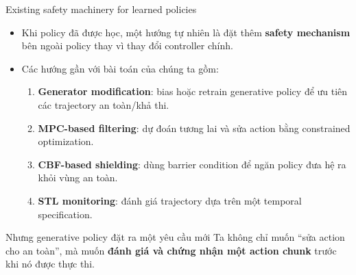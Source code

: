 \documentclass[aspectratio=169]{beamer}
\begin{document}
\begin{frame}[t,shrink=8]{Existing safety machinery for learned policies}

\begin{itemize}
    \item Khi policy đã được học, một hướng tự nhiên là đặt thêm
    \textbf{safety mechanism} bên ngoài policy thay vì thay đổi controller
    chính.

    \vspace{4pt}

    \item Các hướng gần với bài toán của chúng ta gồm:

    \begin{enumerate}
        \item \textbf{Generator modification}:
        bias hoặc retrain generative policy để ưu tiên các trajectory
        an toàn/khả thi.

        \item \textbf{MPC-based filtering}:
        dự đoán tương lai và sửa action bằng constrained optimization.

        \item \textbf{CBF-based shielding}:
        dùng barrier condition để ngăn policy đưa hệ ra khỏi vùng an toàn.

        \item \textbf{STL monitoring}:
        đánh giá trajectory dựa trên một temporal specification.
    \end{enumerate}

\end{itemize}

\vspace{5pt}

\begin{alertblock}{Nhưng generative policy đặt ra một yêu cầu mới}
Ta không chỉ muốn ``sửa action cho an toàn'', mà muốn
\textbf{đánh giá và chứng nhận một action chunk} trước khi nó được thực thi.
\end{alertblock}
\end{frame}

\end{document}
